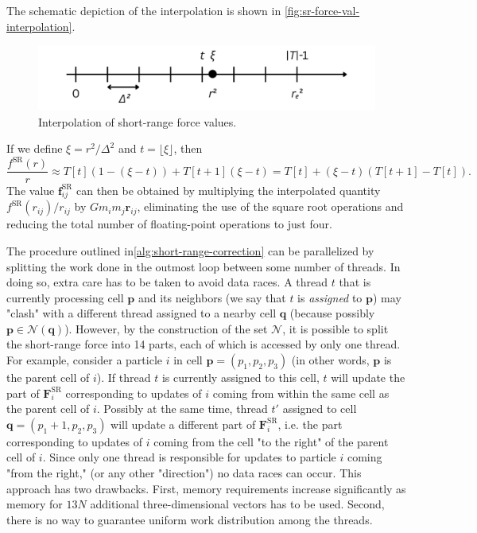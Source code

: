 The schematic depiction of the interpolation is shown in \autoref{fig:sr-force-val-interpolation}.
\begin{figure}[htp]
    \centering
    \includegraphics[scale=0.2]{img/interpolation.png}
    \caption{Interpolation of short-range force values.}
    \label{fig:sr-force-val-interpolation}
\end{figure}
If we define $\xi = r^2 / \Delta^2$ and $t=\lfloor \xi \rfloor$, then
\begin{equation*}
    \frac{f^\text{SR}(r)}{r} \approx T[t]\left(1 - (\xi - t)\right) + T[t+1](\xi - t)
    = T[t] + (\xi - t) (T[t+1] - T[t]).
\end{equation*}
The value $\mathbf{f}^\text{SR}_{ij}$ can then be obtained by multiplying the interpolated quantity $f^\text{SR}(r_{ij})/r_{ij}$ by $G m_i m_j \mathbf{r}_{ij}$, eliminating the use of the square root operations and reducing the total number of floating-point operations to just four.

The procedure outlined in\autoref{alg:short-range-correction} can be parallelized by splitting the work done in the outmost loop between some number of threads.
In doing so, extra care has to be taken to avoid data races.
A thread $t$ that is currently processing cell $\mathbf{p}$ and its neighbors (we say that $t$ is \textit{assigned} to $\mathbf{p}$) may "clash" with a different thread assigned to a nearby cell $\mathbf{q}$ (because possibly $\mathbf{p} \in \mathcal{N}(\mathbf{q})$).
However, by the construction of the set $\mathcal{N}$, it is possible to split the short-range force into 14 parts, each of which is accessed by only one thread.
For example, consider a particle $i$ in cell $\mathbf{p} = (p_1, p_2, p_3)$ (in other words, $\mathbf{p}$ is the parent cell of $i$).
If thread $t$ is currently assigned to this cell, $t$ will update the part of $\mathbf{F}^\text{SR}_i$ corresponding to updates of $i$ coming from within the same cell as the parent cell of $i$.
Possibly at the same time, thread $t'$ assigned to cell $\mathbf{q} = (p_1+1, p_2, p_3)$ will update a different part of $\mathbf{F}^\text{SR}_i$, i.e. the part corresponding to updates of $i$ coming from the cell "to the right" of the parent cell of $i$.
Since only one thread is responsible for updates to particle $i$ coming "from the right," (or any other "direction") no data races can occur.
This approach has two drawbacks.
First, memory requirements increase significantly as memory for $13N$ additional three-dimensional vectors has to be used.
Second, there is no way to guarantee uniform work distribution among the threads.